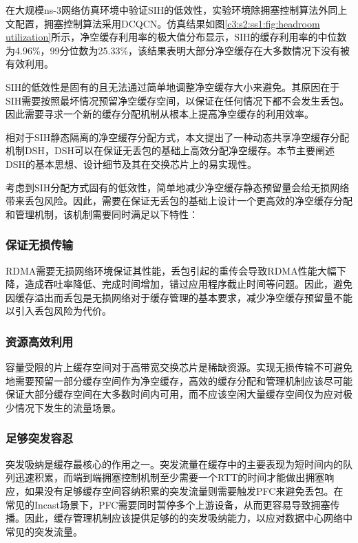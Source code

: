在大规模ns-3网络仿真环境中验证SIH的低效性，实验环境除拥塞控制算法外同上文配置，拥塞控制算法采用DCQCN\cite{SIGCOMM15DCQCN}。仿真结果如图\ref{c3:s2:ss1:fig:headroom utilization}所示，净空缓存利用率的极大值分布显示，SIH的缓存利用率的中位数为4.96\%，99分位数为25.33\%，该结果表明大部分净空缓存在大多数情况下没有被有效利用。

SIH的低效性是固有的且无法通过简单地调整净空缓存大小来避免。其原因在于SIH需要按照最坏情况预留净空缓存空间，以保证在任何情况下都不会发生丢包。因此需要寻求一个新的缓存分配机制从根本上提高净空缓存的利用效率。

\label{c3:s3:dsh design}

相对于SIH静态隔离的净空缓存分配方式，本文提出了一种动态共享净空缓存分配机制DSH，DSH可以在保证无丢包的基础上高效分配净空缓存。本节主要阐述DSH的基本思想、设计细节及其在交换芯片上的易实现性。


考虑到SIH分配方式固有的低效性，简单地减少净空缓存静态预留量会给无损网络带来丢包风险。因此，需要在保证无丢包的基础上设计一个更高效的净空缓存分配和管理机制，该机制需要同时满足以下特性：

\subsubsection{保证无损传输}

RDMA需要无损网络环境保证其性能，丢包引起的重传会导致RDMA性能大幅下降，造成吞吐率降低、完成时间增加，错过应用程序截止时间等问题。因此，避免因缓存溢出而丢包是无损网络对于缓存管理的基本要求，减少净空缓存预留量不能以引入丢包风险为代价。

\subsubsection{资源高效利用}

容量受限的片上缓存空间对于高带宽交换芯片是稀缺资源。实现无损传输不可避免地需要预留一部分缓存空间作为净空缓存，高效的缓存分配和管理机制应该尽可能保证大部分缓存空间在大多数时间内可用，而不应该空闲大量缓存空间仅为应对极少情况下发生的流量场景。

\subsubsection{足够突发容忍}

突发吸纳是缓存最核心的作用之一。突发流量在缓存中的主要表现为短时间内的队列迅速积累，而端到端拥塞控制机制至少需要一个RTT的时间才能做出拥塞响应，如果没有足够缓存空间容纳积累的突发流量则需要触发PFC来避免丢包。在常见的Incast场景下，PFC需要同时暂停多个上游设备，从而更容易导致拥塞传播。因此，缓存管理机制应该提供足够的的突发吸纳能力，以应对数据中心网络中常见的突发流量。

